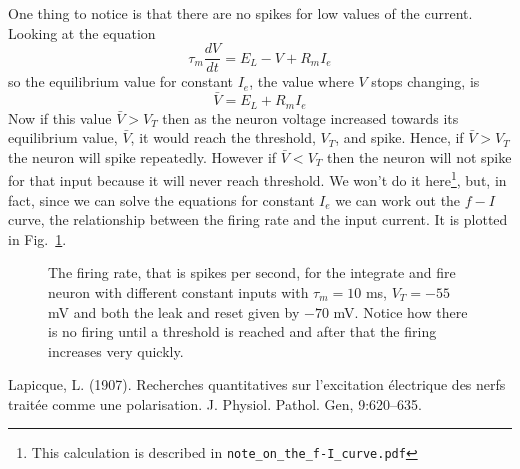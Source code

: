 \documentclass{article}
\begin{document}
One thing to notice is that there are no spikes for low values of the current. Looking at the equation 
\begin{equation}
\tau_m\frac{dV}{dt}=E_L-V+R_mI_e
\end{equation}
so the equilibrium value for constant $I_e$, the value where $V$ stops changing, is
\begin{equation}
\bar{V}=E_L+R_mI_e
\end{equation}
Now if this value $\bar{V}>V_T$ then as the neuron voltage increased
towards its equilibrium value, $\bar{V}$, it would reach the
threshold, $V_T$, and spike. Hence, if $\bar{V}>V_T$ the neuron will
spike repeatedly.  However if $\bar{V}<V_T$ then the neuron will not
spike for that input because it will never reach threshold. We won't do it here\footnote{This calculation is described in \texttt{note\_on\_the\_f-I\_curve.pdf}}, but, in fact, since we can
solve the equations for constant $I_e$ we can work out the $f-I$
curve, the relationship between the firing rate and the input
current. It is plotted in Fig.~\ref{f_i_curve}.


\begin{figure}
\begin{center}

\end{center}
\caption{The firing rate, that is spikes per second, for the integrate
  and fire neuron with different constant inputs with $\tau_m=10$ ms,
  $V_T=-55$ mV and both the leak and reset given by $-70$ mV. Notice
  how there is no firing until a threshold is reached and after that
  the firing increases very quickly. \label{f_i_curve}}
\end{figure}


\begin{thebibliography}{99}
Lapicque, L. (1907). 
\newblock Recherches quantitatives sur l'excitation \'{e}lectrique des nerfs trait\'{e}e comme une polarisation. 
\newblock J. Physiol. Pathol. Gen, 9:620--635.
\end{thebibliography}
\end{document}
